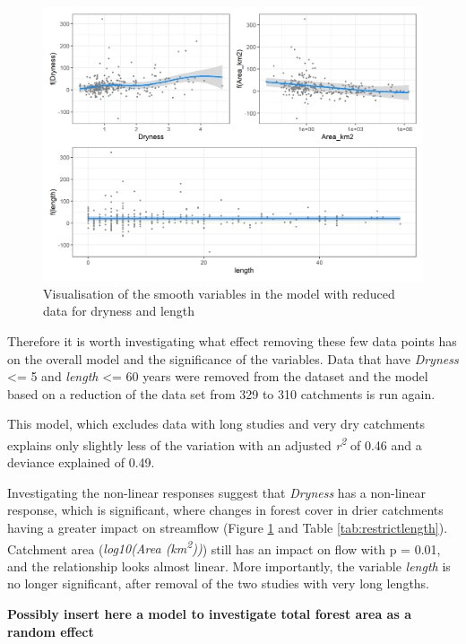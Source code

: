 \documentclass[]{elsarticle} %
\begin{document}
\begin{figure}
\includegraphics[width=0.9\linewidth]{model_redLength_smooths} \caption{Visualisation of the smooth variables in the model with reduced data for dryness and length}\label{fig:smoothsmodelredLength}
\end{figure}

Therefore it is worth investigating what effect removing these few data points has on the overall model and the significance of the variables. Data that have \emph{Dryness} \textless= 5 and \emph{length} \textless= 60 years were removed from the dataset and the model based on a reduction of the data set from 329 to 310 catchments is run again.

This model, which excludes data with long studies and very dry catchments explains only slightly less of the variation with an adjusted \emph{r\textsuperscript{2}} of 0.46 and a deviance explained of 0.49.

Investigating the non-linear responses suggest that \emph{Dryness} has a non-linear response, which is significant, where changes in forest cover in drier catchments having a greater impact on streamflow (Figure \ref{fig:smoothsmodelredLength} and Table \ref{tab:restrictlength}). Catchment area (\emph{log10(Area (km\textsuperscript{2}))}) still has an impact on flow with p = 0.01, and the relationship looks almost linear. More importantly, the variable \emph{length} is no longer significant, after removal of the two studies with very long lengths.

\textbf{Possibly insert here a model to investigate total forest area as a random effect}
\end{document}
